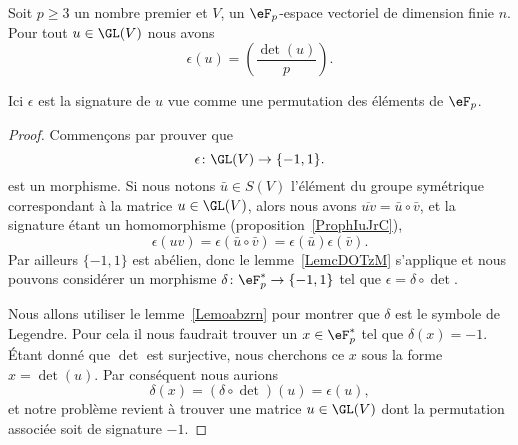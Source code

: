 \begin{theorem}
	Soit \( p\geq 3\) un nombre premier et \( V\), un \( \eF_p\)-espace vectoriel de dimension finie \( n\). Pour tout \( u\in\GL(V)\) nous avons
	\begin{equation}
		\epsilon(u)=\left(\frac{\det(u)}{p}\right).
	\end{equation}
\end{theorem}
Ici \( \epsilon\) est la signature de \( u \) vue comme une permutation des éléments de \( \eF_p\).

\begin{proof}
	Commençons par prouver que
	\begin{equation}
		\epsilon\colon \GL(V)\to \{ -1,1 \}.
	\end{equation}
	est un morphisme. Si nous notons \( \bar u\in S(V)\) l'élément du groupe symétrique correspondant à la matrice \( u\in \GL(V)\), alors nous avons \( \overline{ uv }=\bar u\circ\bar v\), et la signature étant un homomorphisme (proposition~\ref{ProphIuJrC}),
	\begin{equation}
		\epsilon(uv)=\epsilon(\bar u\circ\bar v)=\epsilon(\bar u)\epsilon(\bar v).
	\end{equation}
	Par ailleurs \( \{ -1,1 \}\) est abélien, donc le lemme~\ref{LemcDOTzM} s'applique et nous pouvons considérer un morphisme \( \delta\colon \eF_p^*\to \{ -1,1 \}\) tel que \( \epsilon=\delta\circ\det\).

	Nous allons utiliser le lemme~\ref{Lemoabzrn} pour montrer que \( \delta\) est le symbole de Legendre. Pour cela il nous faudrait trouver un \( x\in \eF_p^*\) tel que \( \delta(x)=-1\). Étant donné que \( \det\) est surjective, nous cherchons ce \( x\) sous la forme \( x=\det(u)\). Par conséquent nous aurions
	\begin{equation}
		\delta(x)=(\delta\circ\det)(u)=\epsilon(u),
	\end{equation}
	et notre problème revient à trouver une matrice \( u\in\GL(V)\) dont la permutation associée soit de signature \( -1\).


\end{proof}
